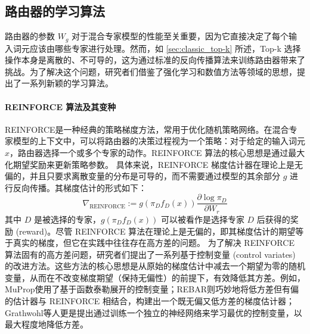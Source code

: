 \subsection{路由器的学习算法}
\label{sec:router_learning}
路由器的参数 $W_g$ 对于混合专家模型的性能至关重要，因为它直接决定了每个输入词元应该由哪些专家进行处理。然而，如 \ref{sec:classic_top-k} 所述，Top-k 选择操作本身是离散的、不可导的，这为通过标准的反向传播算法来训练路由器带来了挑战。为了解决这个问题，研究者们借鉴了强化学习和数值方法等领域的思想，提出了一系列新颖的学习算法。

\paragraph{REINFORCE 算法及其变种}
REINFORCE\cite{Williams2004SimpleSG}是一种经典的策略梯度方法，常用于优化随机策略网络。在混合专家模型的上下文中，可以将路由器的决策过程视为一个策略：对于给定的输入词元 $x$，路由器选择一个或多个专家的动作\cite{Clark2022UnifiedSL}。REINFORCE 算法的核心思想是通过最大化期望奖励来更新策略参数。
具体来说，REINFORCE 梯度估计器在理论上是无偏的，并且只要求离散变量的分布是可导的，而不需要通过模型的其余部分 $g$ 进行反向传播。其梯度估计的形式如下：
\begin{equation}
\nabla_{\text{REINFORCE}} := g(\pi_D f_D(x)) \frac{\partial \log \pi_D}{\partial W_r}
\end{equation}
其中 $D$ 是被选择的专家，$g(\pi_D f_D(x))$ 可以被看作是选择专家 $D$ 后获得的奖励 (reward)。尽管 REINFORCE 算法在理论上是无偏的，即其梯度估计的期望等于真实的梯度，但它在实践中往往存在高方差的问题。
为了解决 REINFORCE 算法固有的高方差问题，研究者们提出了一系列基于控制变量 (control variates) 的改进方法。这些方法的核心思想是从原始的梯度估计中减去一个期望为零的随机变量，从而在不改变梯度期望（保持无偏性）的前提下，有效降低其方差。例如，MuProp\cite{Gu2015MuPropUB}使用了基于函数泰勒展开的控制变量；REBAR\cite{Tucker2017REBARLU}则巧妙地将低方差但有偏的估计器与 REINFORCE 相结合，构建出一个既无偏又低方差的梯度估计器；Grathwohl等人\cite{Grathwohl2017BackpropagationTT}更是提出通过训练一个独立的神经网络来学习最优的控制变量，以最大程度地降低方差。

